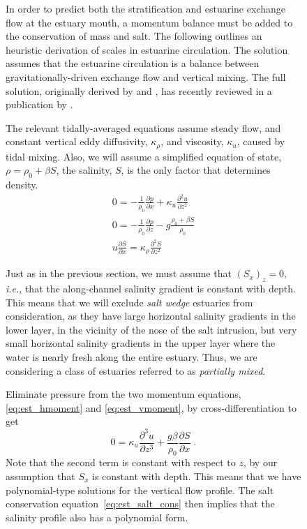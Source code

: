 \documentclass[11pt]{report}
\numberwithin{equation}{section}
\begin{document}
\begin{figure}
In order to predict both the stratification and estuarine exchange flow at the estuary mouth, a momentum balance must be added to the conservation of mass and salt. The following outlines an heuristic derivation of scales in estuarine circulation.  The solution assumes that the estuarine circulation is a balance between gravitationally-driven exchange flow and vertical mixing.  The full solution, originally derived by \citet{hansen.rattray:65} and \citet{chatwin:76}, has recently reviewed in a publication by \citet{maccready.geyer:10}.

The relevant tidally-averaged equations assume steady flow, and constant vertical eddy diffusivity, $\kappa_\rho$, and viscosity, $\kappa_u$, caused by tidal mixing.  Also, we will assume a simplified equation of state, $\rho = \rho_0 + \beta S$, the salinity, $S$, is the only factor that determines density.
\begin{align}
    0 = -\frac{1}{\rho_0}\frac{\partial p}{\partial x} + \kappa_u \frac{\partial^2 u}{\partial z^2}
        \label{eq:est_hmoment} \\
    0 =  -\frac{1}{\rho_0}\frac{\partial p}{\partial z} - g\frac{\rho_0 + \beta S}{\rho_0}
        \label{eq:est_vmoment} \\
    u\frac{\partial S}{\partial x} = \kappa_\rho \frac{\partial^2 S}{\partial z^2}
        \label{eq:est_salt_cons}
\end{align}

Just as in the previous section, we must assume that $(S_x)_z = 0$, \emph{i.e.}, that the along-channel salinity gradient is constant with depth.  This means that we will exclude \emph{salt wedge} estuaries from consideration, as they have large horizontal salinity gradients in the lower layer, in the vicinity of the nose of the salt intrusion, but very small horizontal salinity gradients in the upper layer where the water is nearly fresh along the entire estuary.  Thus, we are considering a class of estuaries referred to as \emph{partially mixed}.  

Eliminate pressure from the two momentum equations, \ref{eq:est_hmoment} and \ref{eq:est_vmoment}, by cross-differentiation to get
\begin{equation}
    0 = \kappa_u \frac{\partial^3 u}{\partial z^3} + \frac{g \beta}{\rho_0}\frac{\partial S}{\partial x} \; .     \label{eq:est_moments}
\end{equation}
Note that the second term is constant with respect to $z$, by our assumption that $S_x$ is constant with depth.  This means that we have polynomial-type solutions for the vertical flow profile.  The salt conservation equation~\ref{eq:est_salt_cons} then implies that the salinity profile also has a polynomial form.


\end{figure}
\end{document}
